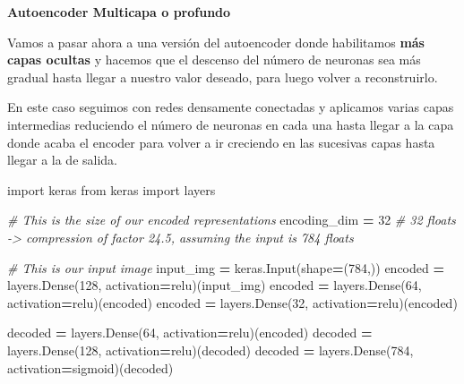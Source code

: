 \documentclass[
  a4paper,
  DIV=11,
  numbers=noendperiod]{scrreprt}
\newenvironment{Shaded}{\begin{snugshade}}{\end{snugshade}}
\newcommand{\CommentTok}[1]{\textcolor[rgb]{0.56,0.35,0.01}{\textit{#1}}}
\newcommand{\DecValTok}[1]{\textcolor[rgb]{0.00,0.00,0.81}{#1}}
\newcommand{\ImportTok}[1]{#1}
\newcommand{\NormalTok}[1]{#1}
\newcommand{\OperatorTok}[1]{\textcolor[rgb]{0.81,0.36,0.00}{\textbf{#1}}}
\newcommand{\StringTok}[1]{\textcolor[rgb]{0.31,0.60,0.02}{#1}}
\begin{document}
\textbf{Autoencoder Multicapa o profundo}

Vamos a pasar ahora a una versión del autoencoder donde habilitamos
\textbf{más capas ocultas} y hacemos que el descenso del número de
neuronas sea más gradual hasta llegar a nuestro valor deseado, para
luego volver a reconstruirlo.

En este caso seguimos con redes densamente conectadas y aplicamos varias
capas intermedias reduciendo el número de neuronas en cada una hasta
llegar a la capa donde acaba el encoder para volver a ir creciendo en
las sucesivas capas hasta llegar a la de salida.

\begin{Shaded}
\begin{Highlighting}[numbers=left,,]

\ImportTok{import}\NormalTok{ keras}
\ImportTok{from}\NormalTok{ keras }\ImportTok{import}\NormalTok{ layers}

\CommentTok{\# This is the size of our encoded representations}
\NormalTok{encoding\_dim }\OperatorTok{=} \DecValTok{32}  \CommentTok{\# 32 floats {-}\textgreater{} compression of factor 24.5, assuming the input is 784 floats}

\CommentTok{\# This is our input image}
\NormalTok{input\_img }\OperatorTok{=}\NormalTok{ keras.Input(shape}\OperatorTok{=}\NormalTok{(}\DecValTok{784}\NormalTok{,))}
\NormalTok{encoded }\OperatorTok{=}\NormalTok{ layers.Dense(}\DecValTok{128}\NormalTok{, activation}\OperatorTok{=}\StringTok{\textquotesingle{}relu\textquotesingle{}}\NormalTok{)(input\_img)}
\NormalTok{encoded }\OperatorTok{=}\NormalTok{ layers.Dense(}\DecValTok{64}\NormalTok{, activation}\OperatorTok{=}\StringTok{\textquotesingle{}relu\textquotesingle{}}\NormalTok{)(encoded)}
\NormalTok{encoded }\OperatorTok{=}\NormalTok{ layers.Dense(}\DecValTok{32}\NormalTok{, activation}\OperatorTok{=}\StringTok{\textquotesingle{}relu\textquotesingle{}}\NormalTok{)(encoded)}

\NormalTok{decoded }\OperatorTok{=}\NormalTok{ layers.Dense(}\DecValTok{64}\NormalTok{, activation}\OperatorTok{=}\StringTok{\textquotesingle{}relu\textquotesingle{}}\NormalTok{)(encoded)}
\NormalTok{decoded }\OperatorTok{=}\NormalTok{ layers.Dense(}\DecValTok{128}\NormalTok{, activation}\OperatorTok{=}\StringTok{\textquotesingle{}relu\textquotesingle{}}\NormalTok{)(decoded)}
\NormalTok{decoded }\OperatorTok{=}\NormalTok{ layers.Dense(}\DecValTok{784}\NormalTok{, activation}\OperatorTok{=}\StringTok{\textquotesingle{}sigmoid\textquotesingle{}}\NormalTok{)(decoded)}


\end{Highlighting}
\end{Shaded}
\end{document}
